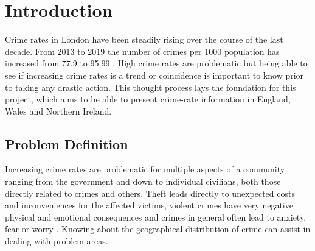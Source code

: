 \documentclass[main.tex]{subfiles}
\begin{document}
\section{Introduction}

% 
%     
%     
%    
% 
% 
%
%     
%     
%     
%
% 


Crime rates in London have been steadily rising over the course of the last decade. From 2013 to 2019 the number of crimes per 1000 population has increased from 77.9 to 95.99 \cite{londonCrime}. High crime rates are problematic but being able to see if increasing crime rates is a trend or coincidence is important to know prior to taking any drastic action. This thought process lays the foundation for this project, which aims to be able to present crime-rate information in England, Wales and Northern Ireland.

\subsection{Problem Definition}
% 


Increasing crime rates are problematic for multiple aspects of a community ranging from the government and down to individual civilians, both those directly related to crimes and others. Theft leads directly to unexpected costs and inconveniences for the affected victims, violent crimes have very negative physical and emotional consequences and crimes in general often lead to anxiety, fear or worry \cite{crimeEffect}. Knowing about the geographical distribution of crime can assist in dealing with problem areas. 
\end{document}
